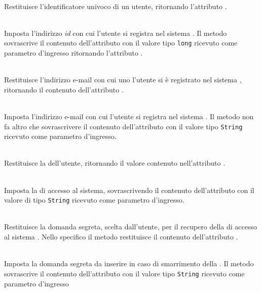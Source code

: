 \begin{description}
	\item{}\\
	Restituisce l'identificatore univoco di un utente, ritornando l'attributo .
	\item{}\\
	Imposta l'indirizzo \textit{id} con cui l'utente si registra nel sistema \caName. Il metodo sovrascrive il contenuto dell'attributo  con il valore tipo \texttt{long} ricevuto come parametro d'ingresso ritornando l'attributo .
	\item{}\\
	Restituisce l'indirizzo e-mail con cui uno l'utente si è registrato nel sistema \caName, ritornando il contenuto dell'attributo .
	\item{}\\ 
	Imposta l'indirizzo e-mail con cui l'utente si registra nel sistema \caName. Il metodo non fa altro che sovrascrivere il contenuto dell'attributo  con il valore tipo \texttt{String} ricevuto come parametro d'ingresso.
	\item{}\\
	Restituisce la  dell'utente, ritornando il valore contenuto nell'attributo .
	\item{}\\
	Imposta la  di accesso al sistema, sovrascrivendo il contenuto dell'attributo  con il valore di tipo \texttt{String} ricevuto come parametro d'ingresso.
	\item{}\\
	Restituisce la domanda segreta, scelta dall'utente, per il recupero della  di accesso al sistema \caName. Nello specifico il metodo restituisce il contenuto dell'attributo .
	\item{}\\
	Imposta la domanda segreta da inserire in caso di smarrimento della . Il metodo sovrascrive il contenuto dell'attributo  con il valore tipo \texttt{String} ricevuto come parametro d'ingresso
	\item{}\\

\end{description}
